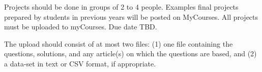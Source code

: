 \documentclass[letterpaper,12pt,twoside,printwatermark=false]{pinp}
\begin{document}
\vspace*{.3in}

Projects should be done in groups of 2 to 4 people. Examples final
projects prepared by students in previous years will be posted on
MyCourses. All projects must be uploaded to myCourses. Due date TBD.

\vspace*{.3in}

The upload should consist of at most two files: (1) one file containing
the questions, solutions, and any article(s) on which the questions are
based, and (2) a data-set in text or CSV format, if appropriate.





\end{document}
